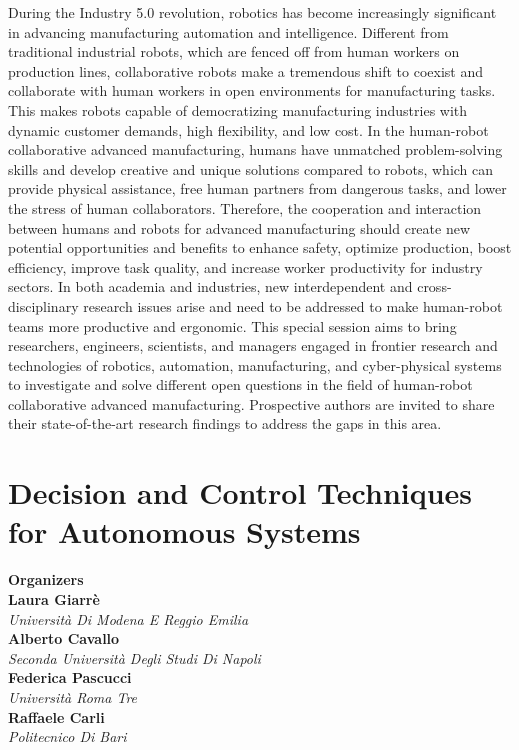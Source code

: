 During the Industry 5.0 revolution, robotics has become increasingly significant in advancing manufacturing automation and intelligence. Different from traditional industrial robots, which are fenced off from human workers on production lines, collaborative robots make a tremendous shift to coexist and collaborate with human workers in open environments for manufacturing tasks. This makes robots capable of democratizing manufacturing industries with dynamic customer demands, high flexibility, and low cost. In the human-robot collaborative advanced manufacturing, humans have unmatched problem-solving skills and develop creative and unique solutions compared to robots, which can provide physical assistance, free human partners from dangerous tasks, and lower the stress of human collaborators. Therefore, the cooperation and interaction between humans and robots for advanced manufacturing should create new potential opportunities and benefits to enhance safety, optimize production, boost efficiency, improve task quality, and increase worker productivity for industry sectors. In both academia and industries, new interdependent and cross-disciplinary research issues arise and need to be addressed to make human-robot teams more productive and ergonomic. This special session aims to bring researchers, engineers, scientists, and managers engaged in frontier research and technologies of robotics, automation, manufacturing, and cyber-physical systems to investigate and solve different open questions in the field of human-robot collaborative advanced manufacturing. Prospective authors are invited to share their state-of-the-art research findings to address the gaps in this area. 

\section{Decision and Control Techniques for Autonomous Systems}


\large \textbf{Organizers} \normalsize \vspace{2mm} \\
\textbf{Laura  Giarrè} \\ 
\textit{Università Di Modena E Reggio Emilia} \vspace{{2mm}} \\
\textbf{Alberto  Cavallo} \\ 
\textit{Seconda Università Degli Studi Di Napoli} \vspace{{2mm}} \\
\textbf{Federica  Pascucci} \\ 
\textit{Università Roma Tre} \vspace{{2mm}} \\
\textbf{Raffaele  Carli} \\ 
\textit{Politecnico Di Bari}

